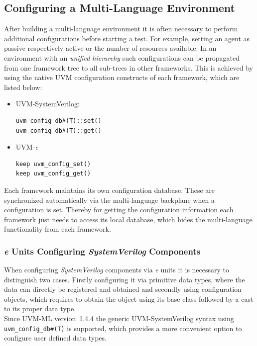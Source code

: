 \subsection{Configuring a Multi-Language Environment} \label{ml_config}

After building a multi-language environment it is often necessary to perform additional configurations before starting a
test. For example, setting an agent as passive respectively active or the number of resources available. In an
environment with an \emph{unified hierarchy} such configurations can be propagated from one framework tree
to all sub-trees in other frameworks. This is achieved by using the native UVM configuration constructs of each
framework, which are listed below:
\begin{itemize}
\item{UVM-SystemVerilog:}
{}
\begin{lstlisting}
uvm_config_db#(T)::set()
uvm_config_db#(T)::get()
\end{lstlisting} 

\item{UVM-\textit{e}}
{}
\begin{lstlisting}
keep uvm_config_set()
keep uvm_config_get()
\end{lstlisting} 
\end{itemize}

Each framework maintains its own configuration database. These are synchronized automatically via the multi-language
backplane when a configuration is set. Thereby for getting the configuration information each framework just needs to
access its local database, which hides the multi-language functionality from each framework.

\subsubsection{\textit{e} Units Configuring \emph{SystemVerilog} Components}\label{e_config_sv}

When configuring \emph{SystemVerilog} components via \textit{e} units it is necessary to distinguish two cases. Firstly
configuring it via primitive data types, where the data can directly be registered and obtained and secondly using
configuration objects, which requires to obtain the object using its base class followed by a cast to its proper data
type.\\
Since UVM-ML version~1.4.4 the generic UVM-SystemVerilog syntax using \lstinline$uvm_config_db#(T)$ is supported, which
provides a more convenient option to configure user defined data types. 

